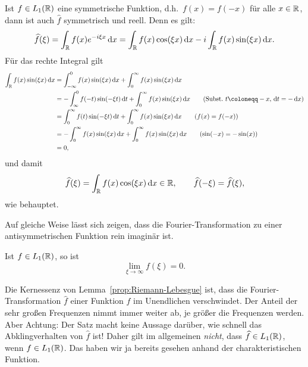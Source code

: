 \begin{remark}
Ist $ f \in L_{1}(\mathbb{R}) $ eine symmetrische Funktion, d.h.\ $ f(x) = f(-x) $ für alle $ x \in \mathbb{R} $, 
dann ist auch $ \widehat{f} $ symmetrisch und reell. Denn es gilt:
\[
   \widehat{f}(\xi)
 = \int_{\R} f(x) e^{-i\xi x} \dif x
 = \int_{\R} f(x) \cos(\xi x) \dif x - i \int_{\R} f(x) \sin(\xi x) \dif x.
\]
Für das rechte Integral gilt
\begin{align}
   \int_{\R} f(x) \sin(\xi x) \dif x \notag
&= \int_{-\infty}^{0} f(x) \sin(\xi x) \dif x + \int_{0}^{\infty} f(x) \sin(\xi x) \dif x 
     \notag \\
&= - \int_{\infty}^{0} f(-t) \sin(-\xi t) \dif t + \int_{0}^{\infty} f(x) \sin(\xi x) \dif x
     \tag{Subst.\ $ t \coloneqq -x $, $ \dif t = -\dif x $} \\
&= \int_{0}^{\infty} f(t) \sin(-\xi t) \dif t + \int_{0}^{\infty} f(x) \sin(\xi x) \dif x
     \tag{$ f(x) = f(-x) $} \\
&= - \int_{0}^{\infty} f(x) \sin(\xi x) \dif x + \int_{0}^{\infty} f(x) \sin(\xi x) \dif x
     \tag{$ \sin(-x) = -\sin(x) $} \\
&= 0 \notag,
\end{align}
und damit
\[
   \widehat{f}(\xi)
 = \int_{\R} f(x) \cos(\xi x) \dif x \in \R, \qquad
   \widehat{f}(- \xi) = \widehat{f}(\xi),
\]
wie behauptet.

Auf gleiche Weise lässt sich zeigen, dass die Fourier-Transformation zu einer antisymmetrischen 
Funktion rein imaginär ist.
\end{remark}

\begin{proposition}\label{prop:Riemann-Lebesgue}
Ist $ f \in L_{1}(\mathbb{R}) $, so ist
\[
  \lim\limits_{\xi \to \infty} f(\xi) = 0.
\]
\end{proposition}

\begin{remark}
Die Kernessenz von Lemma~\ref{prop:Riemann-Lebesgue} ist, dass die Fourier-Transformation 
$ \widehat{f} $ einer Funktion $ f $ im Unendlichen verschwindet. Der Anteil der sehr großen
Frequenzen nimmt immer weiter ab, je größer die Frequenzen werden. Aber Achtung: Der Satz macht
keine Aussage darüber, wie schnell das Abklingverhalten von $ \widehat{f} $ ist! Daher gilt im
allgemeinen \emph{nicht}, dass $ \widehat{f} \in L_{1}(\mathbb{R}) $, wenn $ f \in L_{1}(\mathbb{R}) $. Das haben
wir ja bereits gesehen anhand der charakteristischen Funktion.
\end{remark}

